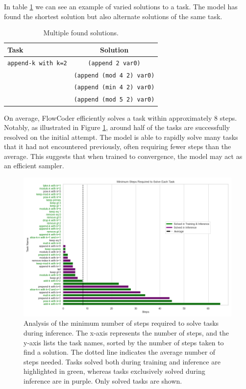In table \ref{tab:multiple_solutions} we can see an example of varied solutions to a task. The model has found the shortest solution but also alternate solutions of the same task.

\begin{table}
    \centering
    \begin{tabular}{|l|c|}
        \hline
        \textbf{Task} & \textbf{Solution}  \\\hline
        \texttt{append-k with k=2} & \texttt{(append 2 var0)} \\
        \texttt{} & \texttt{(append (mod 4 2) var0)} \\
        \texttt{} & \texttt{(append (min 4 2) var0)} \\
        \texttt{} & \texttt{(append (mod 5 2) var0)} \\
        \hline
    \end{tabular}
    \caption{Multiple found solutions.}
    \label{tab:multiple_solutions}
\end{table}

On average, FlowCoder efficiently solves a task within approximately 8 steps. Notably, as illustrated in Figure \ref{fig:plot_min_step_for_solution_inference}, around half of the tasks are successfully resolved on the initial attempt. The model is able to rapidly solve many tasks that it had not encountered previously, often requiring fewer steps than the average. This suggests that when trained to convergence, the model may act as an efficient sampler. 

\begin{figure}
    \centering
    \includegraphics[width=\textwidth]{../img/plot_min_step_for_solution_inference_depth_3_48_tasks2023-12-07 22:24:45_inference.png}
    \caption{Analysis of the minimum number of steps required to solve tasks during inference. The x-axis represents the number of steps, and the y-axis lists the task names, sorted by the number of steps taken to find a solution. The dotted line indicates the average number of steps needed. Tasks solved both during training and inference are highlighted in green, whereas tasks exclusively solved during inference are in purple. Only solved tasks are shown.}
    \label{fig:plot_min_step_for_solution_inference}
\end{figure}

